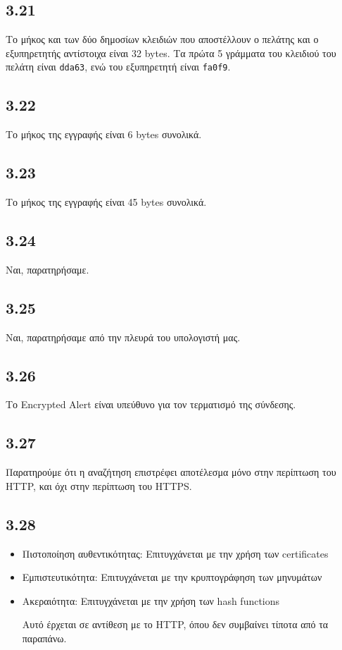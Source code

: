 		\subsection*{3.21}
			Το μήκος και των δύο δημοσίων κλειδιών που αποστέλλουν ο πελάτης και ο εξυπηρετητής αντίστοιχα είναι 32 bytes. Τα πρώτα 5 γράμματα του κλειδιού του πελάτη είναι \verb|dda63|, ενώ του εξυπηρετητή είναι \verb|fa0f9|.			

		\subsection*{3.22}
			Το μήκος της εγγραφής είναι 6 bytes συνολικά.

		\subsection*{3.23}
			Το μήκος της εγγραφής είναι 45 bytes συνολικά.

		\subsection*{3.24}
			Ναι, παρατηρήσαμε.

		\subsection*{3.25}
			Ναι, παρατηρήσαμε από την πλευρά του υπολογιστή μας.

		\subsection*{3.26}
			Το Encrypted Alert είναι υπεύθυνο για τον τερματισμό της σύνδεσης.

		\subsection*{3.27}
			Παρατηρούμε ότι η αναζήτηση επιστρέφει αποτέλεσμα μόνο στην περίπτωση του HTTP, και όχι στην περίπτωση του HTTPS.

		\subsection*{3.28}
			\begin{itemize}
				\item Πιστοποίηση αυθεντικότητας: Επιτυγχάνεται με την χρήση των certificates
				\item Εμπιστευτικότητα: Επιτυγχάνεται με την κρυπτογράφηση των μηνυμάτων
				\item Ακεραιότητα: Επιτυγχάνεται με την χρήση των hash functions
				
				Αυτό έρχεται σε αντίθεση με το HTTP, όπου δεν συμβαίνει τίποτα από τα παραπάνω.
			\end{itemize}
